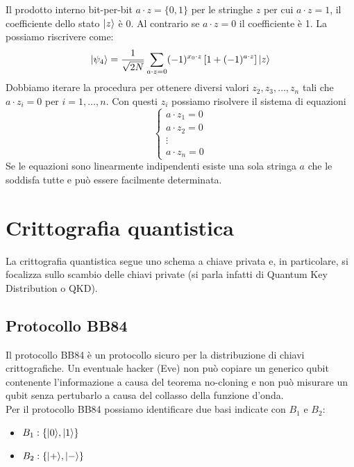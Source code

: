 \documentclass[12pt, a4paper]{report}
\begin{document}
Il prodotto interno bit-per-bit $a\cdot z = \{0,1\}$ per le stringhe $z$ per cui $a\cdot z=1$, il coefficiente dello stato $| z \rangle$ è 0. Al contrario se $a\cdot z=0$ il coefficiente è 1. La possiamo riscrivere come:
\begin{equation*}
    | \psi_{4} \rangle = \frac{1}{\sqrt{2N}} \sum_{a\cdot z=0} (-1)^{x_{0}\cdot z}\left[1+(-1)^{a\cdot z}\right]| z \rangle
\end{equation*}
Dobbiamo iterare la procedura per ottenere diversi valori $z_{2},z_{3},\ldots,z_{n}$ tali che $a\cdot z_{i}=0$ per $i=1,\ldots,n$. Con questi $z_{i}$ possiamo risolvere il sistema di equazioni
\begin{equation*}
    \begin{cases}
        a\cdot z_{1} = 0 \\
        a\cdot z_{2} = 0 \\
        \vdots \\
        a\cdot z_{n} = 0
    \end{cases}
\end{equation*}
Se le equazioni sono linearmente indipendenti esiste una sola stringa $a$ che le soddisfa tutte e può essere facilmente determinata.
\chapter{Crittografia quantistica}
La crittografia quantistica segue uno schema a chiave privata e, in  particolare, si focalizza sullo scambio delle chiavi private (si parla infatti di Quantum Key Distribution o QKD).
\section{Protocollo BB84}
Il protocollo BB84 è un protocollo sicuro per la distribuzione di chiavi crittografiche. Un eventuale hacker (Eve) non può copiare un generico qubit contenente l'informazione a causa del teorema no-cloning e non può misurare un qubit senza pertubarlo a causa del collasso della funzione d'onda.\\
Per il protocollo  BB84 possiamo identificare due basi indicate con $B_{1}$ e $B_{2}$:
\begin{itemize}
    \item $B_{1}:\{| 0 \rangle,| 1 \rangle\}$
    \item $B_{2}: \{| + \rangle,| - \rangle\}$
\end{itemize}
\end{document}
